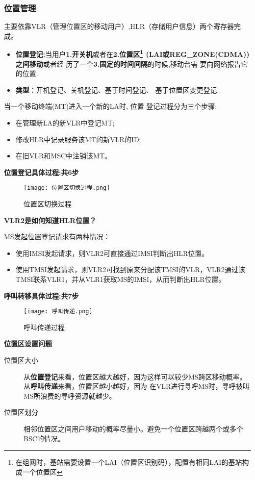 	\subsubsection{位置管理}
	主要依靠VLR（管理位置区的移动用户）,HLR（存储用户信息）两个寄存器完成。
	\begin{itemize}
		\item \textbf{位置登记:}当用户\textbf{1.开关机}或者在\textbf{2.位置区\footnote{在组网时，基站需要设置一个LAI（位置区识别码），配置有相同LAI的基站构成一个位置区}
		(LAI或REG\_ZONE(CDMA))之间移动}或者经
		历了一个\textbf{3.固定的时间间隔}的时候,移动台需
		要向网络报告它的位置.
		\item \textbf{类型}：开机登记、关机登记、基于时间登记、
		基于位置区变更登记.
	\end{itemize}
	当一个移动终端(MT)进入一个新的LA时, 位置
	登记过程分为三个步骤:
	\begin{itemize}
		\item  在管理新LA的新VLR中登记MT;
		\item  修改HLR中记录服务该MT的新VLR的ID;
		\item 在旧VLR和MSC中注销该MT。
	\end{itemize}
	\textbf{位置登记具体过程:共6步}
	\begin{figure}[H]
		\centering
		\texttt{[image: 位置区切换过程.png]}
		\caption{位置区切换过程}
	\end{figure}
	\textbf{VLR2是如何知道HLR位置？}
	
	MS发起位置登记请求有两种情况：
	\begin{itemize}
		\item 使用IMSI发起请求，则VLR2可直接通过IMSI判断出HLR位置。
		\item 使用TMSI发起请求，则VLR2可找到原来分配该TMSI的VLR，VLR2通过该TMSI联系VLR1，并从VLR1获取MS的IMSI，从而判断出HLR位置。
	\end{itemize}
	\textbf{呼叫转移具体过程:共7步}
	\begin{figure}[H]
		\centering
		\texttt{[image: 呼叫传递.png]}
		\caption{呼叫传递过程}
	\end{figure}
	\noindent  \textbf{位置区设置问题}
	\begin{description}
		\item[位置区大小] 从\textbf{位置登记}来看，位置区越大越好，因为这样可以较少MS跨区移动概率。从\textbf{呼叫传递}来看，位置区越小越好，因为
		在VLR进行寻呼MS时，寻呼被叫MS所浪费的寻呼资源就越少。
		\item[位置区划分] 相邻位置区之间用户移动的概率尽量小。避免一个位置区跨越两个或多个BSC的情况。
	\end{description}
	